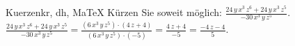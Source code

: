 \begin{MAufgabe}{Kuerzen}{kr, dh, MaTeX}
K\"urzen Sie soweit m\"oglich: $\frac{24\, y\, x^3\, z^6 + 24\, y\, x^3\, z^5}{- 30\, x^3\, y\, z^5}$.\\ 
\ifLsg\MLoesung
\quad $\frac{24\, y\, x^3\, z^6 + 24\, y\, x^3\, z^5}{- 30\, x^3\, y\, z^5}=\frac{(6\, x^3\, y\, z^5)\cdot(4\, z + 4)}{(6\, x^3\, y\, z^5)\cdot(-5)}=\frac{4\, z + 4}{-5}=\frac{ - 4\, z - 4}{5}$.\else\relax\fi
 \end{MAufgabe}